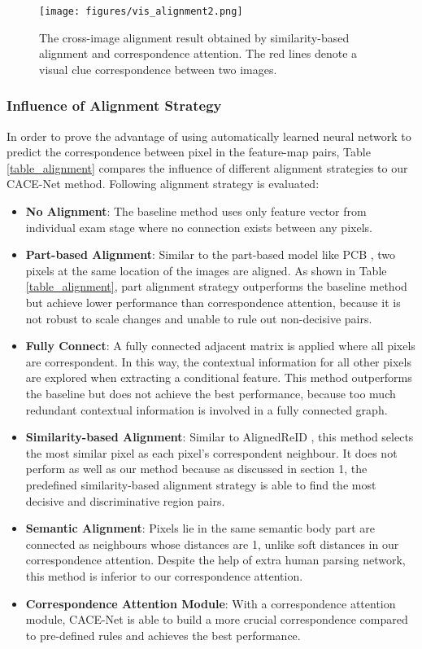 \documentclass[final]{cvpr}
\begin{document}
\begin{figure}[t]
\centering
\texttt{[image: figures/vis\_alignment2.png]} \caption{The cross-image alignment result obtained by similarity-based alignment and correspondence attention. The red lines denote a visual clue correspondence between two images. }
\label{fig_vis_align}
\end{figure}

\subsubsection{Influence of Alignment Strategy}

In order to prove the advantage of using automatically learned neural network to predict the correspondence between pixel in the feature-map pairs, Table \ref{table_alignment} compares the influence of different alignment strategies to our CACE-Net method. Following alignment strategy is evaluated:
\begin{itemize}[leftmargin=*]
    \setlength\itemsep{-5pt}
\item \textbf{No Alignment}: The baseline method uses only feature vector from individual exam stage where no connection exists between any pixels. 
\item \textbf{Part-based Alignment}: Similar to the part-based model like PCB \cite{Sun_2018_ECCV}, two pixels at the same location of the images are aligned. As shown in Table \ref{table_alignment}, part alignment strategy outperforms the baseline method but achieve lower performance than correspondence attention, because it is not robust to scale changes and unable to rule out non-decisive pairs. 
\item \textbf{Fully Connect}: A fully connected adjacent matrix is applied where all pixels are correspondent. In this way, the contextual information for all other pixels are explored when extracting a conditional feature. This method outperforms the baseline but does not achieve the best performance,  because too much redundant contextual information is involved in a fully connected graph. 
\item \textbf{Similarity-based Alignment}: Similar to AlignedReID \cite{zhang2017alignedreid}, this method selects the most similar pixel as each pixel's correspondent neighbour. It does not perform as well as our method because as discussed in section 1, the predefined similarity-based alignment strategy is able to find the most decisive and discriminative region pairs. \item \textbf{Semantic Alignment}: Pixels lie in the same semantic body part are connected as neighbours whose distances are 1, unlike soft distances in our correspondence attention. Despite the help of extra human parsing network, this method is inferior to our correspondence  attention.
\item \textbf{Correspondence Attention Module}: With a correspondence attention module,  CACE-Net is able to build a more crucial correspondence compared to pre-defined rules and achieves the best performance. \end{itemize}
\end{document}
